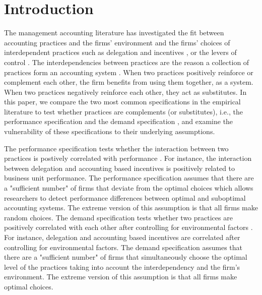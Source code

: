 \documentclass[12pt]{article}
\begin{document}
\newpage


\section{Introduction}\label{introduction}

The management accounting literature has investigated the fit between accounting practices and the firms' environment \citep{chenhall_management_2003, otley_contingency_2016} and the firms' choices of interdependent practices such as delegation and incentives \citep{bouwens_assessing_2007, indjejikian_accounting_2012, moers_performance_2006}, or the levers of control \citep{simons_levers_1994, simons_performance_2000, widener_empirical_2007}. The interdependencies between practices are the reason a collection of practices form an accounting system  \citep{grabner_management_2013,milgrom_complementarities_1995}. When two practices positively reinforce or complement each other, the firm benefits from using them together, as a system. When two practices negatively reinforce each other, they act as substitutes. In this paper, we compare the two most common specifications in the empirical literature to test whether practices are complements (or substitutes), i.e., the performance specification and the demand specification \citep{grabner_management_2013}, and examine the vulnerability of these specifications to their underlying assumptions. 

The performance specification tests whether the interaction between two practices is postively correlated with performance \citep{athey_empirical_1998, carree_note_2011, grabner_management_2013, hofmann_organizational_2017}. For instance, the interaction between delegation and accounting based incentives is positively related to business unit performance. The performance specification assumes that there are a "sufficient number" of firms that deviate from the optimal choices which allows researchers to detect performance differences between optimal and suboptimal accounting systems. The extreme version of this assumption is that all firms make random choices. The demand specification tests whether two practices are positively correlated with each other after controlling for environmental factors \citep{arora_testing_1996, grabner_management_2013, johansson_testing_2018, hofmann_organizational_2017}.  For instance, delegation and accounting based incentives are correlated after controlling for environmental factors. The demand specification assumes that there are a "sufficient number" of firms that simultaneously choose the optimal level of the practices taking into account the interdependency and the firm's environment. The extreme version of this assumption is that all firms make optimal choices.
\end{document}
